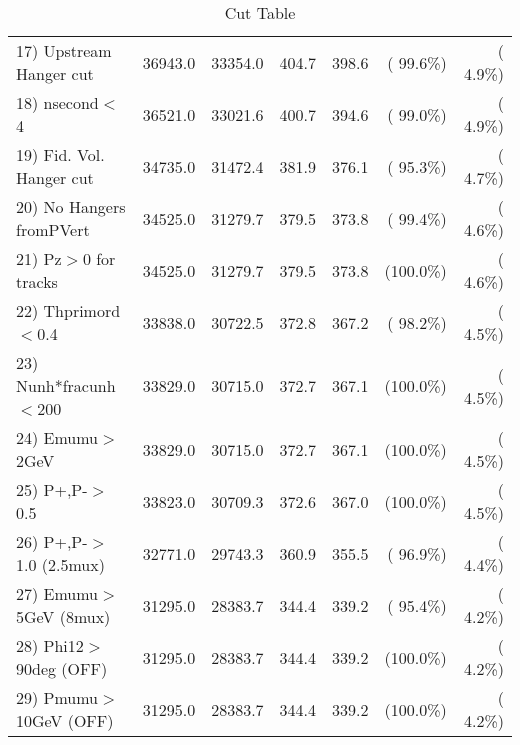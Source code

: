 \begin{table}[h!]
\begin{tabular}{||l||r|r|r|r|r|r||}
 17) Upstream Hanger cut  &      36943.0 &      33354.0 &        404.7 &        398.6 & ( 99.6\%) & (  4.9\%) \\
 18) nsecond$<$4          &      36521.0 &      33021.6 &        400.7 &        394.6 & ( 99.0\%) & (  4.9\%) \\
 19) Fid. Vol. Hanger cut &      34735.0 &      31472.4 &        381.9 &        376.1 & ( 95.3\%) & (  4.7\%) \\
 20) No Hangers fromPVert &      34525.0 &      31279.7 &        379.5 &        373.8 & ( 99.4\%) & (  4.6\%) \\
 21) Pz$>$0 for tracks    &      34525.0 &      31279.7 &        379.5 &        373.8 & (100.0\%) & (  4.6\%) \\
 22) Thprimord$<$0.4      &      33838.0 &      30722.5 &        372.8 &        367.2 & ( 98.2\%) & (  4.5\%) \\
 23) Nunh*fracunh$<$200   &      33829.0 &      30715.0 &        372.7 &        367.1 & (100.0\%) & (  4.5\%) \\
 24) Emumu$>$2GeV         &      33829.0 &      30715.0 &        372.7 &        367.1 & (100.0\%) & (  4.5\%) \\
 25) P+,P-$>$0.5          &      33823.0 &      30709.3 &        372.6 &        367.0 & (100.0\%) & (  4.5\%) \\
 26) P+,P-$>$1.0 (2.5mux) &      32771.0 &      29743.3 &        360.9 &        355.5 & ( 96.9\%) & (  4.4\%) \\
 27) Emumu$>$5GeV  (8mux) &      31295.0 &      28383.7 &        344.4 &        339.2 & ( 95.4\%) & (  4.2\%) \\
 28) Phi12$>$90deg  (OFF) &      31295.0 &      28383.7 &        344.4 &        339.2 & (100.0\%) & (  4.2\%) \\
 29) Pmumu$>$10GeV  (OFF) &      31295.0 &      28383.7 &        344.4 &        339.2 & (100.0\%) & (  4.2\%) \\
 \hline
 \hline
 \end{tabular}
 \caption{Cut Table           }
 \label{tab-cutcohjpsi-mumu_cohpip}
 \end{table}
